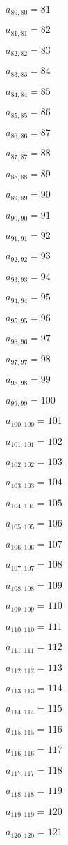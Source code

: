 \documentclass[a4paper,12pt]{article}
\begin{document}
$a _{ 80, 80 } = 81$

$a _{ 81, 81 } = 82$

$a _{ 82, 82 } = 83$

$a _{ 83, 83 } = 84$

$a _{ 84, 84 } = 85$

$a _{ 85, 85 } = 86$

$a _{ 86, 86 } = 87$

$a _{ 87, 87 } = 88$

$a _{ 88, 88 } = 89$

$a _{ 89, 89 } = 90$

$a _{ 90, 90 } = 91$

$a _{ 91, 91 } = 92$

$a _{ 92, 92 } = 93$

$a _{ 93, 93 } = 94$

$a _{ 94, 94 } = 95$

$a _{ 95, 95 } = 96$

$a _{ 96, 96 } = 97$

$a _{ 97, 97 } = 98$

$a _{ 98, 98 } = 99$

$a _{ 99, 99 } = 100$

$a _{ 100, 100 } = 101$

$a _{ 101, 101 } = 102$

$a _{ 102, 102 } = 103$

$a _{ 103, 103 } = 104$

$a _{ 104, 104 } = 105$

$a _{ 105, 105 } = 106$

$a _{ 106, 106 } = 107$

$a _{ 107, 107 } = 108$

$a _{ 108, 108 } = 109$

$a _{ 109, 109 } = 110$

$a _{ 110, 110 } = 111$

$a _{ 111, 111 } = 112$

$a _{ 112, 112 } = 113$

$a _{ 113, 113 } = 114$

$a _{ 114, 114 } = 115$

$a _{ 115, 115 } = 116$

$a _{ 116, 116 } = 117$

$a _{ 117, 117 } = 118$

$a _{ 118, 118 } = 119$

$a _{ 119, 119 } = 120$

$a _{ 120, 120 } = 121$
\end{document}
